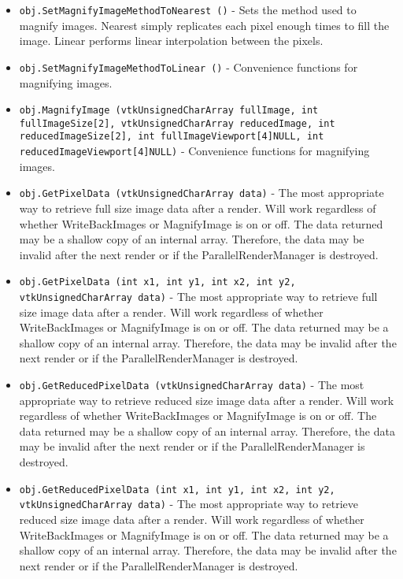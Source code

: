 \begin{itemize}
\item  \verb|obj.SetMagnifyImageMethodToNearest ()| -  Sets the method used to magnify images.  Nearest simply replicates
 each pixel enough times to fill the image.  Linear performs linear
 interpolation between the pixels.

\item  \verb|obj.SetMagnifyImageMethodToLinear ()| -  Convenience functions for magnifying images.

\item  \verb|obj.MagnifyImage (vtkUnsignedCharArray fullImage, int fullImageSize[2], vtkUnsignedCharArray reducedImage, int reducedImageSize[2], int fullImageViewport[4]NULL, int reducedImageViewport[4]NULL)| -  Convenience functions for magnifying images.

\item  \verb|obj.GetPixelData (vtkUnsignedCharArray data)| -  The most appropriate way to retrieve full size image data after a
 render.  Will work regardless of whether WriteBackImages or
 MagnifyImage is on or off.  The data returned may be a shallow copy of
 an internal array.  Therefore, the data may be invalid after the next
 render or if the ParallelRenderManager is destroyed.

\item  \verb|obj.GetPixelData (int x1, int y1, int x2, int y2, vtkUnsignedCharArray data)| -  The most appropriate way to retrieve full size image data after a
 render.  Will work regardless of whether WriteBackImages or
 MagnifyImage is on or off.  The data returned may be a shallow copy of
 an internal array.  Therefore, the data may be invalid after the next
 render or if the ParallelRenderManager is destroyed.

\item  \verb|obj.GetReducedPixelData (vtkUnsignedCharArray data)| -  The most appropriate way to retrieve reduced size image data after a
 render.  Will work regardless of whether WriteBackImages or
 MagnifyImage is on or off.  The data returned may be a shallow copy of
 an internal array.  Therefore, the data may be invalid after the next
 render or if the ParallelRenderManager is destroyed.

\item  \verb|obj.GetReducedPixelData (int x1, int y1, int x2, int y2, vtkUnsignedCharArray data)| -  The most appropriate way to retrieve reduced size image data after a
 render.  Will work regardless of whether WriteBackImages or
 MagnifyImage is on or off.  The data returned may be a shallow copy of
 an internal array.  Therefore, the data may be invalid after the next
 render or if the ParallelRenderManager is destroyed.


\end{itemize}
